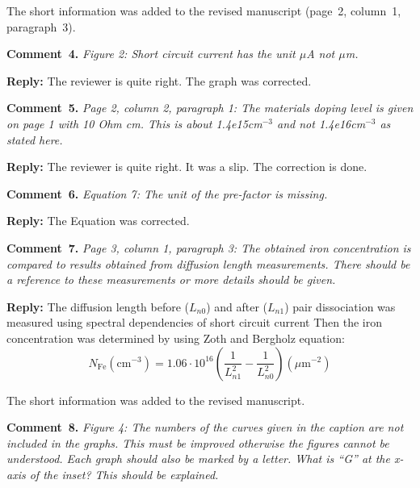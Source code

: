 \documentclass[sn-mathphys]{sn-jnl}
\begin{document}
The short information was added to the revised manuscript (page~2, column~1, paragraph~3).


\vspace{1cm}
\noindent
\textcolor[rgb]{0.00,0.50,1.00}{\textbf{Comment~4.}}
\emph{Figure 2: Short circuit current has the unit $\mu$A not $\mu$m.}

\noindent
\textcolor[rgb]{0.51,0.00,0.00}{\textbf{Reply:}}
The reviewer is quite right.
The graph was corrected.


\vspace{1cm}
\noindent
\textcolor[rgb]{0.00,0.50,1.00}{\textbf{Comment~5.}}
\emph{Page 2, column 2, paragraph 1: The materials doping level is given on page 1 with 10 Ohm cm. This is about 1.4e15cm$^{-3}$ and not 1.4e16cm$^{-3}$ as stated here.}

\noindent
\textcolor[rgb]{0.51,0.00,0.00}{\textbf{Reply:}}
The reviewer is quite right.
It was a slip.
The correction is done.


\vspace{1cm}
\noindent
\textcolor[rgb]{0.00,0.50,1.00}{\textbf{Comment~6.}}
\emph{Equation 7: The unit of the pre-factor is missing. }

\noindent
\textcolor[rgb]{0.51,0.00,0.00}{\textbf{Reply:}}
The Equation was corrected.

\vspace{1cm}
\noindent
\textcolor[rgb]{0.00,0.50,1.00}{\textbf{Comment~7.}}
\emph{Page 3, column 1, paragraph 3: The obtained iron concentration is compared to results obtained from diffusion length measurements. There should be a reference to these measurements or more details should be given.}

\noindent
\textcolor[rgb]{0.51,0.00,0.00}{\textbf{Reply:}}
The diffusion length before ($L_{n0}$) and after ($L_{n1}$) pair dissociation was measured using spectral dependencies of short circuit current
Then the iron concentration was determined by using Zoth and Bergholz\cite{FeB_Zong} equation:
\begin{equation}
  N_\mathrm{Fe}(\mathrm{cm}^{-3})=1.06\cdot10^{16}\left(\frac{1}{L_{n1}^2}-\frac{1}{L_{n0}^2}\right)(\mu\mathrm{m}^{-2})
\end{equation}

The short information was added to the revised manuscript.

\vspace{1cm}
\noindent
\textcolor[rgb]{0.00,0.50,1.00}{\textbf{Comment~8.}}
\emph{Figure 4: The numbers of the curves given in the caption are not included in the graphs. This must be improved otherwise the figures cannot be understood. Each graph should also be marked by a letter. What is ``G'' at the x-axis of the inset? This should be explained. }
\end{document}
